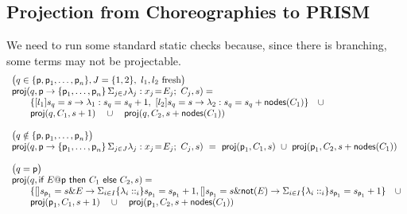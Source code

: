 \subsection{Projection from Choreographies to PRISM}
 We need to run some standard
static checks because, since there is branching, some terms may not be
projectable.
%
\begin{displaymath}
  \begin{array}{lllll}
    \big(q\in\{\textsf{p}, \textsf{p}_1,\ldots,\textsf{p}_n\}, J=\{1,2\},\ l_1, l_2 \text{ fresh}  
    \big)\\
    \mathsf{proj} (q,\textsf{p}\rightarrow \{\textsf{p}_1,\ldots,\textsf{p}_n\}\,\Sigma_{j\in J} \lambda_j: x_j\!=\!E_j;\ C_j, s)= \\
    \qquad\{ 
    [l_1] s_{q} = s \rightarrow \lambda_1: s_{q} = s_{q} +1,\  
    [l_2] s_{q} = s \rightarrow \lambda_2: s_{q} = s_{q} +\mathsf{nodes}(C_1)  
    \}
    \quad\cup\\
    \qquad \mathsf{proj} (q, C_1, s+1)
    \quad\cup\quad
    \mathsf{proj} (q, C_2, s+\mathsf{nodes}(C_1))
    \\\\
    \big(q\notin\{\textsf{p}, \textsf{p}_1,\ldots,\textsf{p}_n\}\big)\\
    \mathsf{proj} (q,\textsf{p}\rightarrow \{\textsf{p}_1,\ldots,\textsf{p}_n\}\,\Sigma_{j\in J} \lambda_j: x_j\!=\!E_j;\ C_j, s)\ = \ \mathsf{proj} (\textsf{p}_1, C_1, s)
    \ \cup\
    \mathsf{proj} (\textsf{p}_1, C_2, s+\mathsf{nodes}(C_1))
    \\\\
    \big(q = \textsf{p}\big)\\
    \mathsf{proj} (q,\textsf{if } E@\textsf{p} \textsf{ then } {C_1} \textsf{ else } {C_2}, s)= \\
    \qquad\{ 
    [] s_{\textsf{p}_1} = s \& E \rightarrow \Sigma_{i\in I}\{\lambda_i: :_i\} s_{\textsf{p}_1} = s_{\textsf{p}_1} +1,  
    [] s_{\textsf{p}_1} = s \& \mathsf{not}(E) \rightarrow \Sigma_{i\in I}\{\lambda_i: :_i\} s_{\textsf{p}_1} = s_{\textsf{p}_1} +1  
    \}
    \quad\cup\\
    \qquad \mathsf{proj} (\textsf{p}_1, C_1, s+1)
    \quad\cup\quad
    \mathsf{proj} (\textsf{p}_1, C_2, s+\mathsf{nodes}(C_1))
  \end{array}
\end{displaymath}


       







